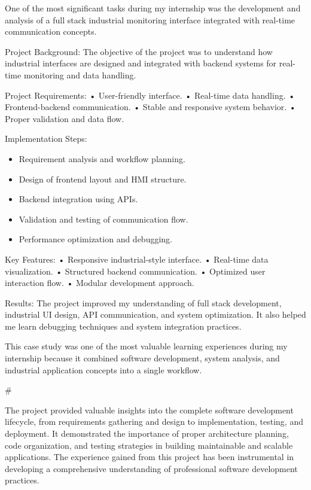 \documentclass[12pt,a4paper]{report}
\begin{document}
One of the most significant tasks during my internship was the development and analysis of a full stack industrial monitoring interface integrated with real-time communication concepts.


Project Background: The objective of the project was to understand how industrial interfaces are designed and integrated with backend systems for real-time monitoring and data handling.


Project Requirements: • User-friendly interface. • Real-time data handling. • Frontend-backend communication. • Stable and responsive system behavior. • Proper validation and data flow.


Implementation Steps:

\begin{itemize}[leftmargin=1.5em]
    \item Requirement analysis and workflow planning.
    \item Design of frontend layout and HMI structure.
    \item Backend integration using APIs.
    \item Validation and testing of communication flow.
    \item Performance optimization and debugging.
\end{itemize}

Key Features: • Responsive industrial-style interface. • Real-time data visualization. • Structured backend communication. • Optimized user interaction flow. • Modular development approach.


Results: The project improved my understanding of full stack development, industrial UI design, API communication, and system optimization. It also helped me learn debugging techniques and system integration practices.


This case study was one of the most valuable learning experiences during my internship because it combined software development, system analysis, and industrial application concepts into a single workflow.


\#


The project provided valuable insights into the complete software development lifecycle, from requirements gathering and design to implementation, testing, and deployment. It demonstrated the importance of proper architecture planning, code organization, and testing strategies in building maintainable and scalable applications. The experience gained from this project has been instrumental in developing a comprehensive understanding of professional software development practices.
\end{document}
